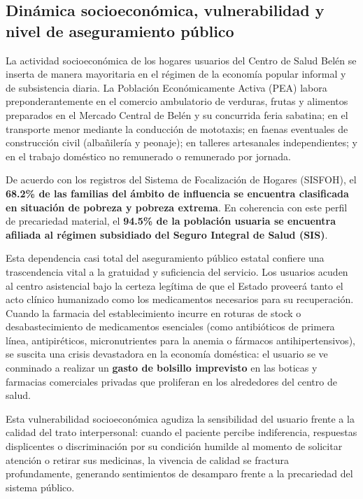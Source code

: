 \subsection{Dinámica socioeconómica, vulnerabilidad y nivel de aseguramiento público}
\label{sec:2.4_economia}

La actividad socioeconómica de los hogares usuarios del Centro de Salud Belén se inserta de manera mayoritaria en el régimen de la economía popular informal y de subsistencia diaria. La Población Económicamente Activa (PEA) labora preponderantemente en el comercio ambulatorio de verduras, frutas y alimentos preparados en el Mercado Central de Belén y su concurrida feria sabatina; en el transporte menor mediante la conducción de mototaxis; en faenas eventuales de construcción civil (albañilería y peonaje); en talleres artesanales independientes; y en el trabajo doméstico no remunerado o remunerado por jornada.

De acuerdo con los registros del Sistema de Focalización de Hogares (SISFOH), el \textbf{68.2\% de las familias del ámbito de influencia se encuentra clasificada en situación de pobreza y pobreza extrema}. En coherencia con este perfil de precariedad material, el \textbf{94.5\% de la población usuaria se encuentra afiliada al régimen subsidiado del Seguro Integral de Salud (SIS)}.

Esta dependencia casi total del aseguramiento público estatal confiere una trascendencia vital a la gratuidad y suficiencia del servicio. Los usuarios acuden al centro asistencial bajo la certeza legítima de que el Estado proveerá tanto el acto clínico humanizado como los medicamentos necesarios para su recuperación. Cuando la farmacia del establecimiento incurre en roturas de stock o desabastecimiento de medicamentos esenciales (como antibióticos de primera línea, antipiréticos, micronutrientes para la anemia o fármacos antihipertensivos), se suscita una crisis devastadora en la economía doméstica: el usuario se ve conminado a realizar un \textbf{gasto de bolsillo imprevisto} en las boticas y farmacias comerciales privadas que proliferan en los alrededores del centro de salud.

Esta vulnerabilidad socioeconómica agudiza la sensibilidad del usuario frente a la calidad del trato interpersonal: cuando el paciente percibe indiferencia, respuestas displicentes o discriminación por su condición humilde al momento de solicitar atención o retirar sus medicinas, la vivencia de calidad se fractura profundamente, generando sentimientos de desamparo frente a la precariedad del sistema público.
